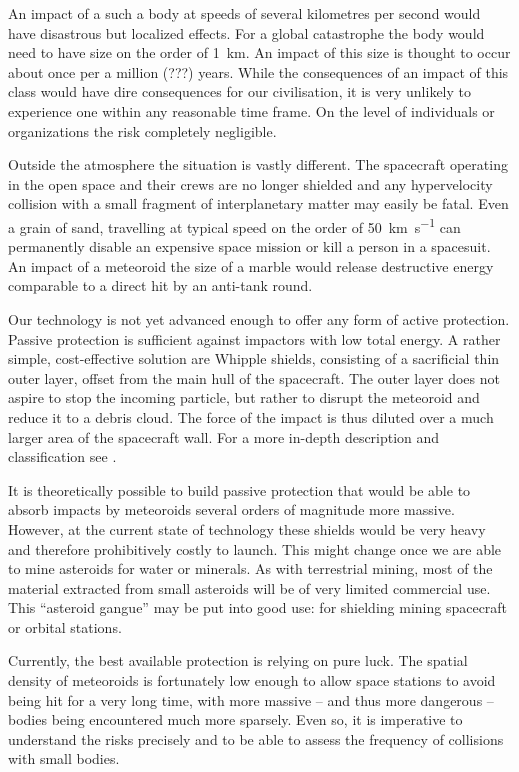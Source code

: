     An impact of a such a body at speeds of several kilometres per second would have disastrous but localized effects.
    For a global catastrophe the body would need to have size on the order of \SI{1}{\kilo\metre}.
    An impact of this size is thought to occur about once per a million (???) years. 
    While the consequences of an impact of this class would have dire consequences for our civilisation,
    it is very unlikely to experience one within any reasonable time frame.
    On the level of individuals or organizations the risk completely negligible.

    Outside the atmosphere the situation is vastly different.
    The spacecraft operating in the open space and their crews are no longer shielded
    and any hypervelocity collision with a small fragment of interplanetary matter may easily be fatal.
    Even a grain of sand, travelling at typical speed on the order of \SI{50}{\kilo\metre\per\second} can permanently disable
    an expensive space mission or kill a person in a spacesuit.
    An impact of a meteoroid the size of a marble would release
    destructive energy comparable to a direct hit by an anti-tank round.

    Our technology is not yet advanced enough to offer any form of active protection.
    Passive protection is sufficient against impactors with low total energy.
    A rather simple, cost-effective solution are Whipple shields, consisting of a sacrificial thin outer layer,
    offset from the main hull of the spacecraft.
    The outer layer does not aspire to stop the incoming particle,
    but rather to disrupt the meteoroid and reduce it to a debris cloud.
    The force of the impact is thus diluted over a much larger area of the spacecraft wall.
    For a more in-depth description and classification see \citet{nasa-shield}.

    It is theoretically possible to build passive protection that would be able to absorb impacts
    by meteoroids several orders of magnitude more massive.
    However, at the current state of technology these shields would be very heavy and therefore prohibitively costly to launch.
    This might change once we are able to mine asteroids for water or minerals.
    As with terrestrial mining, most of the material extracted from small asteroids will be of very limited commercial use.
    This ``asteroid gangue'' may be put into good use: for shielding mining spacecraft or orbital stations.

    Currently, the best available protection is relying on pure luck. The spatial density of meteoroids is
    fortunately low enough to allow space stations to avoid being hit for a very long time,
    with more massive -- and thus more dangerous -- bodies being encountered much more sparsely.
    Even so, it is imperative to understand the risks precisely and to be able to assess the frequency
    of collisions with small bodies.

